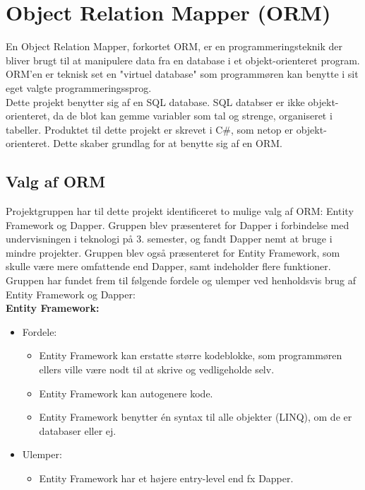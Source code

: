 \section{Object Relation Mapper (ORM)}\label{sec:orm}
En Object Relation Mapper, forkortet ORM, er en programmeringsteknik der bliver brugt til
at manipulere data fra en database i et objekt-orienteret program. ORM'en er teknisk set en 
"virtuel database" som programmøren kan benytte i sit eget valgte programmeringssprog. \\

Dette projekt benytter sig af en SQL database. SQL databser er ikke objekt-orienteret, da de
blot kan gemme variabler som tal og strenge, organiseret i tabeller. Produktet til dette projekt
er skrevet i C\#, som netop er objekt-orienteret. Dette skaber grundlag for at benytte sig af en
ORM. 

\subsection{Valg af ORM}
Projektgruppen har til dette projekt identificeret to mulige valg af ORM: Entity Framework og Dapper.
Gruppen blev præsenteret for Dapper i forbindelse med undervisningen i teknologi på 3. semester, og fandt Dapper
nemt at bruge i mindre projekter. Gruppen blev også præsenteret for Entity Framework, som skulle være mere omfattende
end Dapper, samt indeholder flere funktioner. \\ 
Gruppen har fundet frem til følgende fordele og ulemper ved henholdsvis brug af Entity Framework og Dapper: \\

\textbf{Entity Framework:}
\begin{itemize}
    \item Fordele:
    \begin{itemize}
        \item Entity Framework kan erstatte større kodeblokke, som programmøren ellers ville være nodt til at skrive og vedligeholde selv.
        \item Entity Framework kan autogenere kode.
        \item Entity Framework benytter én syntax til alle objekter (LINQ), om de er databaser eller ej.
    \end{itemize}
    \item Ulemper:
    \begin{itemize}
        \item Entity Framework har et højere entry-level end fx Dapper.
    \end{itemize}
\end{itemize}

